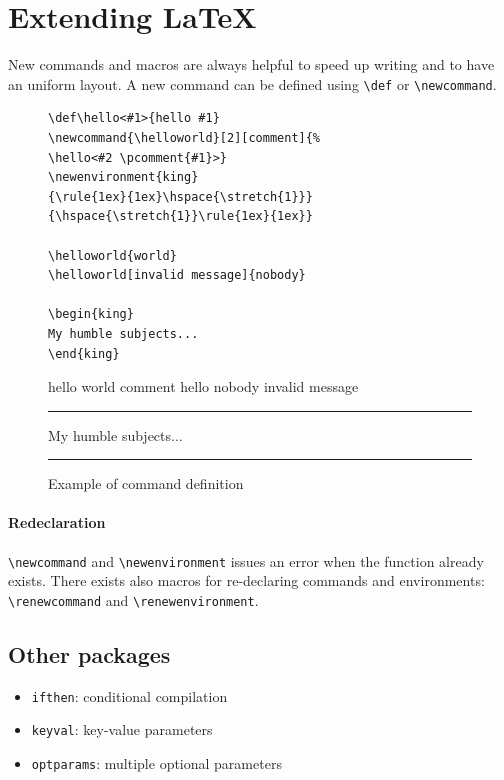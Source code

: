 \section{Extending \LaTeX{}}

New commands and macros are always helpful to speed up writing and to have an
uniform layout.
A new command can be defined using \lstinline$\def$ or \lstinline$\newcommand$.

\begin{figure}[H]
\centering
\begin{minipage}{0.5\linewidth}
\begin{lstlisting}[basicstyle=\scriptsize\ttfamily]
\def\hello<#1>{hello #1}
\newcommand{\helloworld}[2][comment]{%
\hello<#2 \pcomment{#1}>}
\newenvironment{king}
{\rule{1ex}{1ex}\hspace{\stretch{1}}}
{\hspace{\stretch{1}}\rule{1ex}{1ex}}

\helloworld{world}
\helloworld[invalid message]{nobody}

\begin{king}
My humble subjects...
\end{king}
\end{lstlisting}
\end{minipage}
\begin{minipage}{0.4\linewidth}
\def\hello<#1>{hello #1}
\newcommand{\helloworld}[2][comment]{%
\hello<#2 \pcomment{#1}>}
\newenvironment{king}
{\rule{1ex}{1ex}\hspace{\stretch{1}}}
{\hspace{\stretch{1}}\rule{1ex}{1ex}}

\helloworld{world}
\helloworld[invalid message]{nobody}

\begin{king}
My humble subjects...
\end{king}
\end{minipage}
\caption{Example of command definition}
\end{figure}

\paragraph{Redeclaration}
\lstinline$\newcommand$ and \lstinline$\newenvironment$ issues an error when the
function already exists.
There exists also macros for re-declaring commands and environments:
\lstinline$\renewcommand$ and \lstinline$\renewenvironment$.

\subsection*{Other packages}
\begin{itemize}
\item \texttt{ifthen}: conditional compilation
\item \texttt{keyval}: key-value parameters
\item \texttt{optparams}: multiple optional parameters
\end{itemize}
